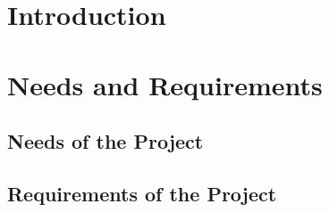 
\newpage

\section{Introduction}
\lipsum[2-5]

\newpage

\section{Needs and Requirements}
\lipsum[4]

\subsection{Needs of the Project}
\lipsum[5]

\subsection{Requirements of the Project}
\lipsum[6-7]